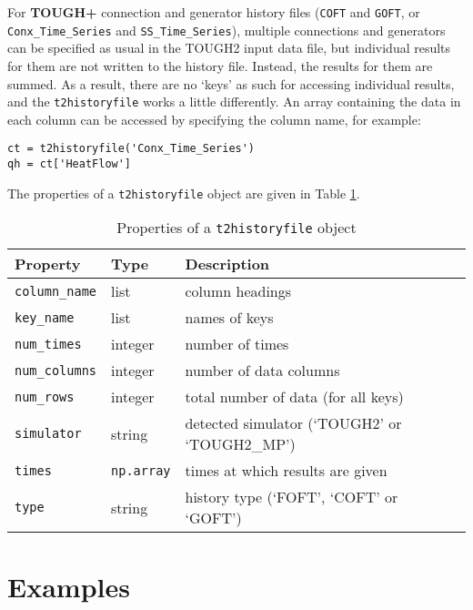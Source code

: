 For \textbf{TOUGH+} connection and generator history files (\texttt{COFT} and \texttt{GOFT}, or \texttt{Conx\_Time\_Series} and \texttt{SS\_Time\_Series}), multiple connections and generators can be specified as usual in the TOUGH2 input data file, but individual results for them are not written to the history file.  Instead, the results for them are summed.  As a result, there are no `keys' as such for accessing individual results, and the \texttt{t2historyfile} works a little differently.  An array containing the data in each column can be accessed by specifying the column name, for example:

\begin{verbatim}
ct = t2historyfile('Conx_Time_Series')
qh = ct['HeatFlow']
\end{verbatim}

The properties of a \texttt{t2historyfile} object are given in Table \ref{tb:historyfile_properties}.

\begin{table}
  \begin{center}
    \begin{tabular}{|l|l|l|}
      \hline
      \textbf{Property} & \textbf{Type} & \textbf{Description}\\
      \hline
      \texttt{column\_name} & list & column headings\\
      \texttt{key\_name} & list & names of keys\\
      \texttt{num\_times} & integer & number of times\\
      \texttt{num\_columns} & integer & number of data columns\\
      \texttt{num\_rows} & integer & total number of data (for all keys)\\
      \texttt{simulator} & string & detected simulator (`TOUGH2' or `TOUGH2\_MP')\\
      \texttt{times} & \texttt{np.array} & times at which results are given\\
      \texttt{type} & string & history type (`FOFT', `COFT' or `GOFT')\\
      \hline
    \end{tabular}
    \caption{Properties of a \texttt{t2historyfile} object}
    \label{tb:historyfile_properties}
  \end{center}
\end{table}

\section{Examples}

